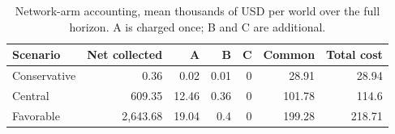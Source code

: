 \begin{table}[!htbp]\centering\small
\caption{Network-arm accounting, mean thousands of USD per world over the full horizon. A is charged once; B and C are additional.}
\begin{tabularx}{\linewidth}{Yrrrrrr}\toprule
Scenario & Net collected & A & B & C & Common & Total cost\\\midrule
Conservative & 0.36 & 0.02 & 0.01 & 0 & 28.91 & 28.94\\
Central & 609.35 & 12.46 & 0.36 & 0 & 101.78 & 114.6\\
Favorable & 2,643.68 & 19.04 & 0.4 & 0 & 199.28 & 218.71\\
\bottomrule
\end{tabularx}
\par{}\par
\end{table}
